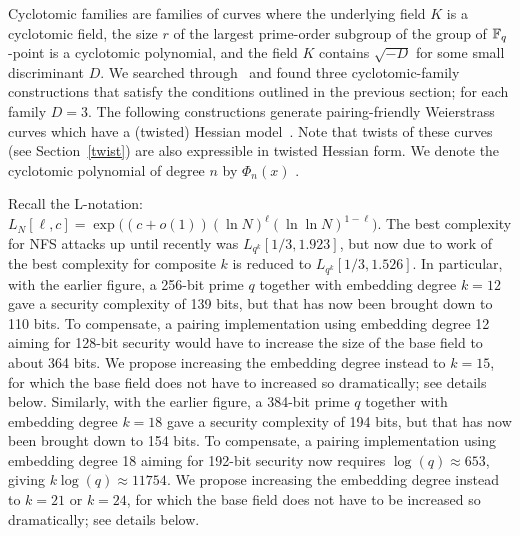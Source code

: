 Cyclotomic families are families of curves where the underlying field $K$ is a cyclotomic field,
the size $r$ of the largest prime-order subgroup of the group of $\mathbb{F}_{q}$-point is a cyclotomic polynomial,
and the field $K$ contains $\sqrt{-D}$ for some small discriminant $D$.
We searched through~\cite{2010/freeman} and found three cyclotomic-family constructions that satisfy the conditions outlined in the previous section; for each family $D = 3$.
The following constructions generate pairing-friendly Weierstrass curves
which have a (twisted) Hessian model~\cite[Section 5]{2015/hessian}.
Note that twists of these curves (see Section~\ref{twist}) are also expressible in twisted Hessian form.
We denote the cyclotomic polynomial of degree $n$ by $\Phi_{n}(x)$ .

Recall the L-notation:
$L_N[\ell,c] = \exp \big( (c + o(1))(\ln N)^{\ell}(\ln\ln N)^{1-\ell} \big).$
The best complexity for NFS attacks up until recently was $L_{q^k}[1/3, 1.923]$, 
but now due to work of \cite{2016/KB} the best complexity for composite $k$ is reduced to
$L_{q^k}[1/3, 1.526]$.
In particular, with the earlier figure, a 256-bit prime $q$ together with embedding degree $k=12$ gave a security complexity of 139 bits, but that has now been brought down to 110 bits.
To compensate, a pairing implementation using embedding degree 12 aiming for 128-bit security would have to increase the size of the base field to about 364 bits.
We propose increasing the embedding degree instead to $k=15$, for which the base field does not have to increased so dramatically; see details below.
%
Similarly, with the earlier figure, a 384-bit prime $q$ together with embedding degree $k=18$ gave a security complexity of 194 bits, but that has now been brought down to 154 bits.
To compensate, a pairing implementation using embedding degree 18 aiming for 192-bit security now requires $\log(q) \approx 653$, giving $k\log(q) \approx 11754$.
We propose increasing the embedding degree instead to $k=21$ or $k=24$, for which the base field does not have to be increased so dramatically; see details below.
